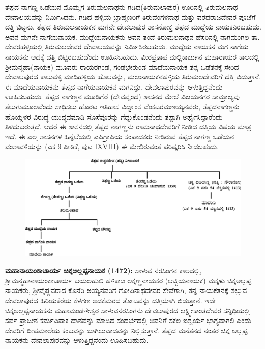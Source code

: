ತೆಪ್ಪದ ನಾಗಣ್ಣ ಒಡೆಯನ ಮೊಮ್ಮಗ ತಿರುಮಲನಾಥನು ಗಡಿದ(ತಿರುಮಲಾಪುರ) ಊರಿನಲ್ಲಿ ತಿರುಮಲನಾಥ ದೇವಾಲಯ\-ವನ್ನು ನಿರ್ಮಿಸಿದನು. ಗಡಿದ ಹಳ್ಳಿಯ ಬ್ರಾಹ್ಮಣರಿಗೆ ತಿರುವೆಂಗಳನಾಥ ಮತ್ತು ವರದರಾಜದೇವರ ಪೂಜೆಗೆ ದತ್ತಿ ಬಿಟ್ಟನು. ತೆಪ್ಪದ ತಿರುಮಲನಾಯಕನ ಮಗನೇ ದೇವಲಾಪುರ ಶಾಸನೋಕ್ತ ತೆಪ್ಪದ ಮುದ್ದೆಯ ನಾಯಕನಿರಬಹುದು. ಅವನ ಮಗನೇ ನಾಗೆಯನಾಯಕ. ಮುದ್ದೆಯನಾಯಕನು ಅವನ ತಂದೆ ತಿರುಮಲನಾಥನ ಹೆಸರಿನಲ್ಲಿ ನಾಗಮಂಗಲ ತಾ. ದೇವರಹಳ್ಳಿಯಲ್ಲಿ ತಿರುಮಲದೇವರ ದೇವಾಲಯವನ್ನು ನಿರ್ಮಿಸಿರಬಹುದು. ಮುದ್ದೆಯ ನಾಯಕನ ಮಗ ನಾಗೆಯ ನಾಯಕನು ಅದಕ್ಕೆ ದತ್ತಿ ಬಿಟ್ಟಿರಬಹುದೆಂದು ಊಹಿಸಬಹುದು. ವೀರಪ್ರತಾಪ ಮಲ್ಲಿಕಾರ್ಜುನ ಮಹಾರಾಯರ ಕಾಲದಲ್ಲಿ ಶ‍್ರೀಮನ್ಮಹಾ(ನಾಯಕ) ಮೂವರು ರಾಯರಗಂಡ, ಗಂಡಭೇರುಂಡ ಮಾದೆಯನಾಯಕ ತನ್ನ ಒಡೆತನಕ್ಕೆ ಸೇರಿದ ದೇವಾಲಪುರದ ಕಾಲುವಳ್ಳಿ ಮಾದಿಹಳ್ಳಿಯ ಹೊಲವನ್ನು, ಮಲುನಾಯಕನಹಳ್ಳಿಯ ತಿರುಮಲದೇವರಿಗೆ ದತ್ತಿ ಬಿಡುತ್ತಾನೆ. ಈ ಮಾದೆಯನಾಯಕನು ತೆಪ್ಪದ ನಾಗೆಯನಾಯಕನ ಮಗನಿದ್ದು, ದೇವಲಾಪುರವನ್ನು ಆಳುತ್ತಿದ್ದನೆಂದು ಊಹಿಸಬಹುದು. ತೆಪ್ಪದ ನಾಗಣ್ಣನ ಮೂಡಿಗೆರೆ (ದೇವವೃಂದ) ಶಾಸನದ ಮೇಲೆ ವಿಜಯನಗರ ಸಾಮ್ರಾಜ್ಯವು ತೆಲುಗುಮೂಲವೆಂದು ಸಾಧಿಸಲು ಹೊರಟ ಇತಿಹಾಸ ವಿದ್ವಾಂಸ ವೆಂಕಟರಮಣಯ್ಯನವರು, ತೆಪ್ಪದನಾಗಣ್ಣನು ಹೊಯ್ಸಳರ ವಿರುದ್ಧ ಯುದ್ಧವಮಾಡಿ ಸೊಸೆವೂರನ್ನು ಗೆದ್ದುಕೊಂಡನೆಂದು ತಪ್ಪಾಗಿ ಅರ್ಥೈಸಿದ್ದಾರೆಂದು ತಿಳಿದುಬರುತ್ತದೆ. ಆದರೆ ಈ ಶಾಸನದಲ್ಲಿ ತೆಪ್ಪದ ನಾಗಣ್ಣನು ರಾಮನಾಥದೇವರಿಗೆ ನೀಡಿದ ದತ್ತಿಯ ವಿಷಯ ಮಾತ್ರ ಇದೆ. ಈ ಎಲ್ಲ ಶಾಸನಗಳ ಹಿನ್ನೆಲೆಯಲ್ಲಿ ಎಪಿಗ್ರಾಫಿಯ ಸಂಪಾದಕರು ನೀಡಿರುವ ತೆಪ್ಪದ ನಾಗಣ್ಣ ಒಡೆಯನ ವಂಶಾವಳಿಯನ್ನು (ಎಕ 9 ಪೀಠಿಕೆ, ಪುಟ IXVIII) ಈ ಮೇಲಿರುವಂತೆ ಪರಿಷ್ಕರಿಸಿ ನೀಡಬಹುದು.

\begin{figure}[H]
\includegraphics[scale=1.02]{images/chap3/chap3fig44.jpeg}
\end{figure}

\textbf{ಮಹಾನಾಯಂಕಾಚಾರ್ಯ ಚಿಕ್ಕಅಲ್ಲಪ್ಪನಾಯಕ (1472):} ಸಾಳುವ ನರಸಿಂಗನ ಕಾಲದಲ್ಲಿ, ಶ‍್ರೀಮನ್ಮಹಾನಾಯಂಕಾ\-ಚಾರ್ಯ ಬಯಲಹುಲಿ ಹಳಿಕಾಱ ಲಕ್ಕಣ್ಣನಾಯಕರ (ಲಚ್ಚಿಯನಾಯಕ) ಮಕ್ಕಳು ಚಿಕ್ಕಅಲ್ಲಪ್ಪ ನಾಯಕರು, ಶ‍್ರೀವೈಷ್ಣವರಾದ ಕೊನೆರಿ ಅಯ್ಯನವರಿಗೆ ಗೋಪಿನಾಥದೇವರ ಸೇವೆಗಾಗಿ, ತನ್ನ ನಾಯಕತನಕ್ಕೆ ಸಲ್ಲುವ ದೇವಲಾಪುರದ ಹಿರಿಯಕೆರೆಯ ಕೆಳಗಣ ಅಡಕೆಮರದ ತೋಟವನ್ನು ದತ್ತಿಯಾಗಿ ಬಿಡುತ್ತಾನೆ. ಇದೇ ಚಿಕ್ಕಅಲ್ಲಪ್ಪನಾಯಕನು ಮಹಾಮಂಡಳೇಶ್ವರ ಸಾಳುವ\break ನರಸಿಂಗನು ದೇವಲಾಪುರದ ಲಕ್ಷ್ಮೀಕಾಂತದೇವರ ಸನ್ನಿಧಿಯಲ್ಲಿ ಸರ್ವ ಪ್ರಾಚೀನ ಕರ್ಮವಿಪಾಕ ದಾನವನ್ನು ಮಾಡಿದ ಸಂದರ್ಭದಲ್ಲಿ ಅವನಿಗೆ ಸಕಲ ಐಶ್ವರ್ಯ ಭಾಗ್ಯವಾಗಲಿ ಎಂದು ದೇವರಿಗೆ ದೀಪಮಾಲೆಯ ಕಂಬವನ್ನು ಬಾಗಿಲುವಾಡವನ್ನು ನಿಲ್ಲಿಸುತ್ತಾನೆ. ತೆಪ್ಪದ ಮನೆತನದ ನಂತರ ಚಿಕ್ಕ ಅಲ್ಲಪ್ಪ ನಾಯಕನು ದೇವಲಾಪುರವನ್ನು ಆಳುತ್ತಿದ್ದನೆಂದು ಊಹಿಸಬಹುದು.

